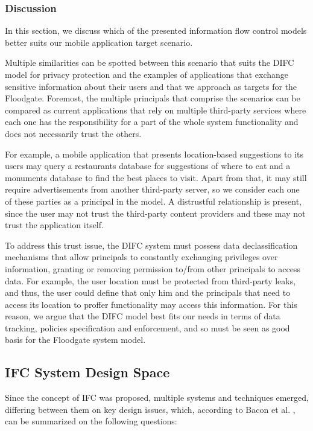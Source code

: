\subsubsection{Discussion}
In this section, we discuss which of the presented information flow control models better suits our mobile application target scenario.

Multiple similarities can be spotted between this scenario that suits the DIFC model for privacy protection and the examples of applications that exchange sensitive information about their users and that we approach as targets for the Floodgate. Foremost, the multiple principals that comprise the scenarios can be compared as current applications that rely on multiple third-party services where each one has the responsibility for a part of the whole system functionality and does not necessarily trust the others.

For example, a mobile application that presents location-based suggestions to its users may query a restaurants database for suggestions of where to eat and a monuments database to find the best places to visit. Apart from that, it may still require advertisements from another third-party server, so we consider each one of these parties as a principal in the model. A distrustful relationship is present, since the user may not trust the third-party content providers and these may not trust the application itself.

To address this trust issue, the DIFC system must possess data declassification mechanisms that allow principals to constantly exchanging privileges over information, granting or removing permission to/from other principals to access data. For example, the user location must be protected from third-party leaks, and thus, the user could define that only him and the principals that need to access its location to proffer functionality may access this information. For this reason, we argue that the DIFC model best fits our needs in terms of data tracking, policies specification and enforcement, and so must be seen as good basis for the Floodgate system model.

\subsection{IFC System Design Space}
\label{sec:ifc-system-design-space}

Since the concept of IFC was proposed, multiple systems and techniques emerged, differing between them on key design issues, which, according to Bacon et al. \cite{bacon2014}, can be summarized on the following questions:

